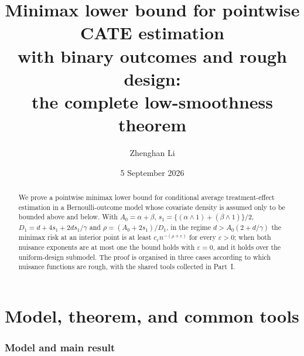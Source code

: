 \documentclass[11pt]{article}
\title{Minimax lower bound for pointwise CATE estimation\\
with binary outcomes and rough design:\\
\large the complete low-smoothness theorem}
\author{Zhenghan Li}
\date{5 September 2026}
\begin{document}
\hypersetup{pageanchor=false}
\clearpage
\setcounter{page}{1}
\hypersetup{pageanchor=true}
\maketitle

\begin{abstract}
We prove a pointwise minimax lower bound for conditional average
treatment-effect estimation in a Bernoulli-outcome model whose covariate
density is assumed only to be bounded above and below.  With
\(A_0=\alpha+\beta\), \(s_1=\{(\alpha\wedge1)+(\beta\wedge1)\}/2\),
\(D_1=d+4s_1+2ds_1/\gamma\) and \(\rho=(A_0+2s_1)/D_1\), in the regime
\(d>A_0(2+d/\gamma)\) the minimax risk at an interior point is at least
\(c_\varepsilon n^{-(\rho+\varepsilon)}\) for every \(\varepsilon>0\); when
both nuisance exponents are at most one the bound holds with
\(\varepsilon=0\), and it holds over the uniform-design submodel.  The
proof is organised in three cases according to which nuisance functions
are rough, with the shared tools collected in Part~I.
\end{abstract}

\tableofcontents

\part{Model, theorem, and common tools}

\section{Model and main result}\label{sec:model}
\end{document}
